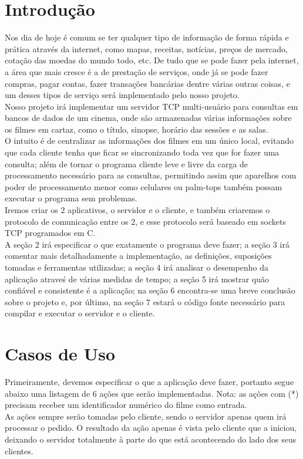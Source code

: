 \documentclass[11pt,twoside]{article}
\begin{document}
\section{Introdução}
Nos dia de hoje é comum se ter qualquer tipo de informação de forma rápida e prática através da internet, como mapas, receitas, notícias, preços de mercado, cotação das moedas do mundo todo, etc. De tudo que se pode fazer pela internet, a área que mais cresce é a de prestação de serviços, onde já se pode fazer compras, pagar contas, fazer transações bancárias dentre várias outras coisas, e um desses tipos de serviço será implementado pelo nosso projeto.\\
Nosso projeto irá implementar um servidor TCP multi-usuário para consultas em bancos de dados de um cinema, onde são armazenadas várias informações sobre os filmes em cartaz, como o título, sinopse, horário das sessões e as salas.\\
O intuito é de centralizar as informações dos filmes em um único local, evitando que cada cliente tenha que ficar se sincronizando toda vez que for fazer uma consulta; além de tornar o programa cliente leve e livre da carga de processamento necessário para as consultas, permitindo assim que aparelhos com poder de processamento menor como celulares ou palm-tops também possam executar o programa sem problemas.\\
Iremos criar os 2 aplicativos, o servidor e o cliente, e também criaremos o protocolo de comunicação entre os 2, e esse protocolo será baseado em sockets TCP programados em C.\\
A seção 2 irá especificar o que exatamente o programa deve fazer; a seção 3 irá comentar mais detalhadamente a implementação, as definições, suposições tomadas e ferramentas utilizadas; a seção 4 irá analisar o desempenho da aplicação atraveś de várias medidas de tempo; a seção 5 irá mostrar quão confiável e consistente é a aplicação; na seção 6 encontra-se uma breve conclusão sobre o projeto e, por último, na seção 7 estará o código fonte necessário para compilar e executar o servidor e o cliente.


\section{Casos de Uso}
Primeiramente, devemos especificar o que a aplicação deve fazer, portanto segue abaixo uma listagem de 6 ações que serão implementadas. Nota: as ações com (*) precisam receber um identificador numérico do filme como entrada.\\
As ações sempre serão tomadas pelo cliente, sendo o servidor apenas quem irá processar o pedido. O resultado da ação apenas é vista pelo cliente que a iniciou, deixando o servidor totalmente à parte do que está acontecendo do lado dos seus clientes.
\end{document}
